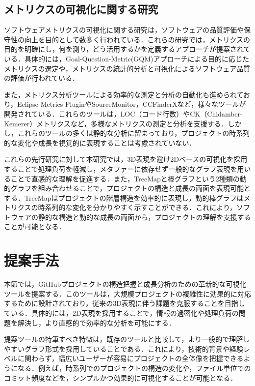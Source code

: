 \documentclass[12pt,twoside]{jbook}
\begin{document}
\section{メトリクスの可視化に関する研究}
ソフトウェアメトリクスの可視化に関する研究は，ソフトウェアの品質評価や保守性の向上を目的として数多く行われている\cite{阿萬裕久2011ソフトウェアメトリクスとデータ分析の基礎}．これらの研究では，メトリクスの目的を明確にし，何を測り，どう活用するかを定義するアプローチが提案されている．具体的には，Goal-Question-Metric(GQM)アプローチによる目的に応じたメトリクスの選定や，メトリクスの統計的分析と可視化によるソフトウェア品質の評価が行われている．

また，メトリクス分析ツールによる効率的な測定と分析の自動化も進められており，Eclipse Metrics PluginやSourceMonitor，CCFinderXなど，様々なツールが開発されている．これらのツールは，LOC（コード行数）やCK（Chidamber-Kemerer）メトリクスなど，多様なメトリクスの測定と分析を支援する．しかし，これらのツールの多くは静的な分析に留まっており，プロジェクトの時系列的な変化や成長を視覚的に表現することは考慮されていない．

これらの先行研究に対して本研究では，3D表現を避け2Dベースの可視化を採用することで処理負荷を軽減し，メタファーに依存せず一般的なグラフ表現を用いることで直感的な理解を促進する．また，TreeMapと棒グラフという2種類の動的グラフを組み合わせることで，プロジェクトの構造と成長の両面を表現可能とする．TreeMapはプロジェクトの階層構造を効率的に表現し，動的棒グラフはメトリクスの時系列的な変化を分かりやすく示すことができる．これにより，ソフトウェアの静的な構造と動的な成長の両面から，プロジェクトの理解を支援することが可能となる．

\chapter{提案手法}
本節では，GitHubプロジェクトの構造把握と成長分析のための革新的な可視化ツールを提案する．このツールは，大規模プロジェクトの複雑性に効果的に対応するために設計されており，従来の3D表現に伴う課題を克服することを目指している．具体的には，2D表現を採用することで，情報の過密化や処理負荷の問題を解決し，より直感的で効率的な分析を可能にする．

提案ツールの特筆すべき特徴は，既存のツールと比較して，より一般的で理解しやすいグラフ形式を採用していることである．これにより，技術的背景や経験レベルに関わらず，幅広いユーザーが容易にプロジェクトの全体像を把握できるようになる．例えば，時系列でのプロジェクトの構造の変化や，ファイル単位でのコミット頻度などを，シンプルかつ効果的に可視化することが可能となる．
\end{document}
